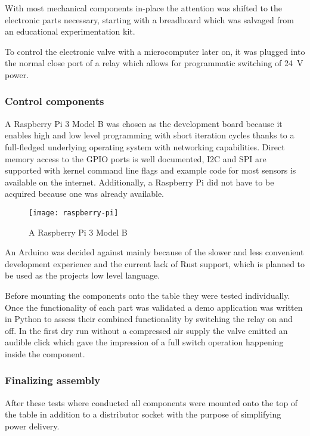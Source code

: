 With most mechanical components in-place the attention was shifted to the electronic parts necessary, starting with a breadboard which was salvaged from an educational experimentation kit. 

To control the electronic valve with a microcomputer later on, it was plugged into the normal close port of a relay which allows for programmatic switching of \SI{24}{\volt} power. 

\subsubsection{Control components}
A Raspberry Pi 3 Model B \cite{raspberry-pi} was chosen as the development board because it enables high and low level programming with short iteration cycles thanks to a full-fledged underlying operating system \cite{raspbian} with networking capabilities. Direct memory access to the GPIO ports is well documented, I2C and SPI are supported with kernel command line flags and example code for most sensors is available on the internet. Additionally, a Raspberry Pi did not have to be acquired because one was already available.

\begin{figure}[h]
\centering

\texttt{[image: raspberry-pi]}

\caption{A Raspberry Pi 3 Model B}
\end{figure}

An Arduino was decided against mainly because of the slower and less convenient development experience and the current lack of Rust \cite{rust} support, which is planned to be used as the projects low level language.

Before mounting the components onto the table they were tested individually. Once the functionality of each part was validated a demo application was written in Python to assess their combined functionality by switching the relay on and off. In the first dry run without a compressed air supply the valve emitted an audible click which gave the impression of a full switch operation happening inside the component.

\subsubsection{Finalizing assembly}
After these tests where conducted all components were mounted onto the top of the table in addition to a distributor socket with the purpose of simplifying power delivery.

